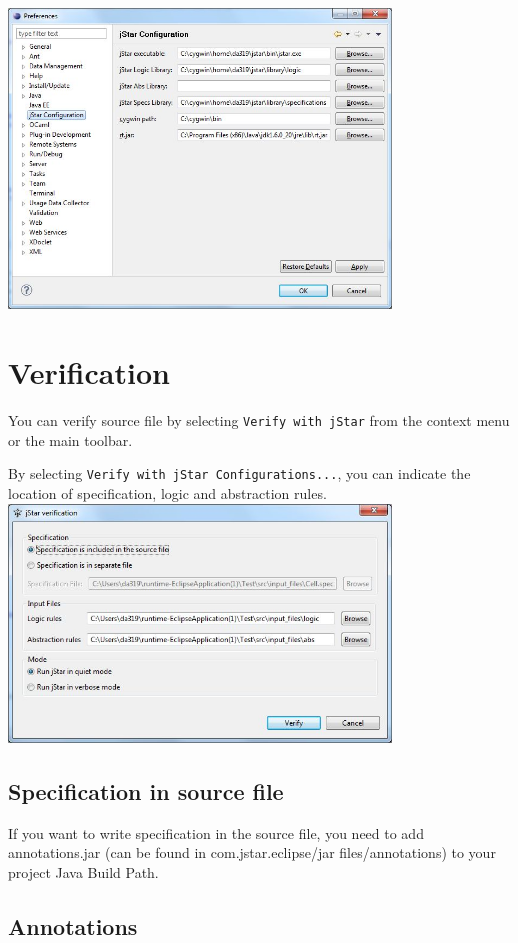\documentclass{article}
\begin{document}
\includegraphics[width=4in]{images/preferences.jpg}

\section{Verification}
You can verify source file by selecting \texttt{Verify with jStar} from the context menu or the main toolbar. 

By selecting \texttt{Verify with jStar Configurations...}, you can indicate the location of specification, logic and abstraction rules.\\

\includegraphics[width=4in]{images/verificationWindow.jpg}

\subsection*{Specification in source file}

If you want to write specification in the source file, you need to add annotations.jar (can be found in com.jstar.eclipse/jar files/annotations) to your project Java Build Path.

\subsection*{Annotations}
\end{document}
